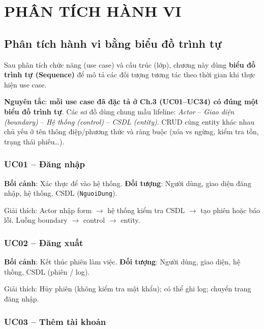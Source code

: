 \chapter{PHÂN TÍCH HÀNH VI}

\section{Phân tích hành vi bằng biểu đồ trình tự}

Sau phân tích chức năng (use case) và cấu trúc (lớp), chương này dùng \textbf{biểu đồ trình tự (Sequence)} để mô tả các đối tượng tương tác theo thời gian khi thực hiện use case.

\textbf{Nguyên tắc}: \textbf{mỗi use case đã đặc tả ở Ch.3 (UC01--UC34) có đúng một biểu đồ trình tự}. Các sơ đồ dùng chung mẫu lifeline: \textit{Actor} -- \textit{Giao diện (boundary)} -- \textit{Hệ thống (control)} -- \textit{CSDL (entity)}. CRUD cùng entity khác nhau chủ yếu ở tên thông điệp/phương thức và ràng buộc (xóa vs ngừng, kiểm tra tồn, trạng thái phiếu\ldots).

\subsection{UC01 -- Đăng nhập}

\textbf{Bối cảnh}: Xác thực để vào hệ thống. \textbf{Đối tượng}: Người dùng, giao diện đăng nhập, hệ thống, CSDL (\texttt{NguoiDung}).



Giải thích: Actor nhập form $\rightarrow$ hệ thống kiểm tra CSDL $\rightarrow$ tạo phiên hoặc báo lỗi. Luồng boundary $\rightarrow$ control $\rightarrow$ entity.

\subsection{UC02 -- Đăng xuất}

\textbf{Bối cảnh}: Kết thúc phiên làm việc. \textbf{Đối tượng}: Người dùng, giao diện, hệ thống, CSDL (phiên / log).



Giải thích: Hủy phiên (không kiểm tra mật khẩu); có thể ghi log; chuyển trang đăng nhập.

\subsection{UC03 -- Thêm tài khoản}

